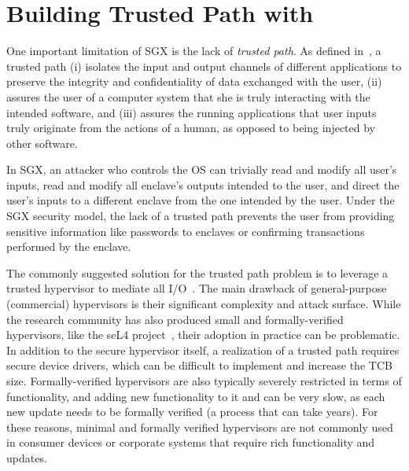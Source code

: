 \section{Building Trusted Path with \name}
\label{sec:secureInput}


One important limitation of SGX is the lack of \emph{trusted path}. As defined in~\cite{filyanov2011uni}, a trusted path (i) isolates the input and output channels of different applications to preserve the integrity and confidentiality of data exchanged with the user, (ii) assures the user of a computer system that she is truly interacting with the intended software, and (iii) assures the running applications that user inputs truly originate from the actions of a human, as opposed to being injected by other software.

In SGX, an attacker who controls the OS can trivially read and modify all user's inputs, read and modify all enclave's outputs intended to the user, and direct the user's inputs to a different enclave from the one intended by the user. Under the SGX security model, the lack of a trusted path prevents the user from providing sensitive information like passwords to enclaves or confirming transactions performed by the enclave.



The commonly suggested solution for the trusted path problem is to leverage a trusted hypervisor to mediate all I/O~\cite{weiser2017sgxio}. The main drawback of general-purpose (commercial) hypervisors is their significant complexity and attack surface. While the research community has also produced small and formally-verified hypervisors, like the seL4 project~\cite{klein2009sel4}, their adoption in practice can be problematic. In addition to the secure hypervisor itself, a realization of a trusted path requires secure device drivers, which can be difficult to implement and increase the TCB size. Formally-verified hypervisors are also typically severely restricted in terms of functionality, and adding new functionality to it and can be very slow, as each new update needs to be formally verified (a process that can take years). For these reasons, minimal and formally verified hypervisors are not commonly used in consumer devices or corporate systems that require rich functionality and updates.

